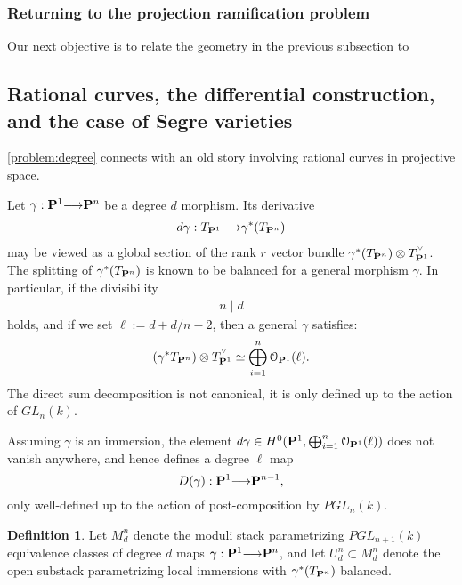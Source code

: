 \documentclass[11pt,reqno]{amsart}
\theoremstyle{plain}
\theoremstyle{definition}
\newtheorem{definition}[theorem]{Definition}
\theoremstyle{remark}
\numberwithin{equation}{section}
\renewcommand{\to}{{\longrightarrow}}
\numberwithin{equation}{section}
\renewcommand{\O}{\mathcal O}
\newcommand{\smvee}{\raise0.5ex\hbox{$\scriptscriptstyle\vee$}}
\begin{document}
\subsubsection{Returning to the projection ramification problem} Our next objective is to relate the geometry in the previous subsection to 



\subsection{Rational curves, the differential construction, and the case of Segre varieties} %
\label{sec:rational_curves_in_projective_space}
\autoref{problem:degree} connects with an old story involving rational curves in projective space.  

Let $\gamma: \P^{1} \to \P^{n}$ be a degree $d$ morphism. Its derivative 
\begin{align*}
    d\gamma:T_{\P^{1}} \to \gamma^{*}(T_{\P^{n}})
  \end{align*}  
may be viewed as a global section of the rank $r$ vector bundle $\gamma^{*}(T_{\P^{n}}) \otimes T_{\P^{1}}^{\smvee}$.  The splitting of $\gamma^{*}(T_{\P^{n}})$ is known to be balanced for a general morphism $\gamma$. In particular, if the divisibility
\begin{align*}
  n \mid d
\end{align*}
holds, and if we set $\ell := d+d/n-2$, then a general $\gamma$ satisfies: 
\begin{align*}
  (\gamma^{*}T_{\P^{n}}) \otimes T_{\P^{1}}^{\smvee} \simeq \bigoplus_{i=1}^{n} \O_{\P^{1}}(\ell).
\end{align*} 
The direct sum decomposition is not canonical, it is only defined up to the
action of $GL_{n}(k)$.  

Assuming $\gamma$ is an immersion, the element $d \gamma \in
H^{0}(\P^{1},\bigoplus_{i=1}^{n} \O_{\P^{1}}(\ell))$ does not vanish anywhere,
and hence defines a degree $\ell$ map $$D(\gamma) : \P^{1} \to \P^{n-1},$$
only well-defined up to the action of post-composition by $PGL_{n}(k)$. 

\begin{definition}
  Let $M^{n}_{d}$ denote the moduli stack parametrizing $PGL_{n+1}(k)$
  equivalence classes of degree $d$ maps $\gamma : \P^{1} \to \P^{n}$, and let
  $U^{n}_{d} \subset M^{n}_{d}$ denote the open substack parametrizing local immersions with $\gamma^{*}(T_{\P^{n}})$ balanced.
\end{definition}
\end{document}
